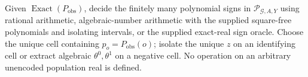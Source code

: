 Given \(\operatorname{Exact}(P_{\mathrm{obs}})\), decide the finitely many polynomial signs in \(\mathscr P_{\mathcal G,A,Y}\) using rational arithmetic, algebraic-number arithmetic with the supplied square-free polynomials and isolating intervals, or the supplied exact-real sign oracle. Choose the unique cell containing \(p_o=P_{\mathrm{obs}}(o)\); isolate the unique \(z\) on an identifying cell or extract algebraic \(\theta^0,\theta^1\) on a negative cell. No operation on an arbitrary unencoded population real is defined.